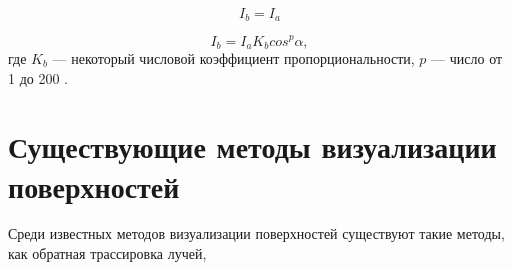 \begin{equation}\label{eq:ideal_intense}
	I_b=I_a
\end{equation}

\begin{equation}\label{eq:intense_phong}
	I_b=I_a K_b cos^p{\alpha},
\end{equation}
где $K_b$ --- некоторый числовой коэффициент пропорциональности, $p$ --- число от 1 до 200 \cite{порев2002компьютерная}.

\section{Существующие методы визуализации поверхностей}

Среди известных методов визуализации поверхностей существуют такие методы, как обратная трассировка лучей, 